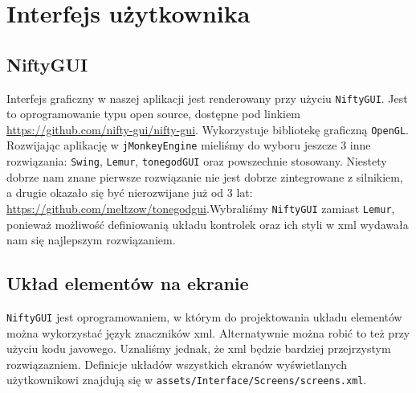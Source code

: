 \documentclass[]{report}
\newcommand{\code}[1]{\colorbox{codegray}{\texttt{#1}}}
\newcommand{\link}[1]{{\color{blue}\href{#1}{#1}}}
\begin{document}
\chapter*{Interfejs użytkownika}
\section{NiftyGUI}
Interfejs graficzny w naszej aplikacji jest renderowany przy użyciu \code{NiftyGUI}. Jest to oprogramowanie typu open source, dostępne pod linkiem \link{https://github.com/nifty-gui/nifty-gui}. Wykorzystuje bibliotekę graficzną \code{OpenGL}. Rozwijając aplikację w \code{jMonkeyEngine} mieliśmy do wyboru jeszcze 3 inne rozwiązania: \code{Swing}, \code{Lemur}, \code{tonegodGUI} oraz powszechnie stosowany. Niestety dobrze nam znane pierwsze rozwiązanie nie jest dobrze zintegrowane z silnikiem, a drugie okazało się być nierozwijane już od 3 lat: \link{https://github.com/meltzow/tonegodgui}.Wybraliśmy \code{NiftyGUI} zamiast \code{Lemur}, ponieważ możliwość definiowanią układu kontrolek oraz ich styli w xml wydawała nam się najlepszym rozwiązaniem.


\section{Układ elementów na ekranie}
\code{NiftyGUI} jest oprogramowaniem, w którym do projektowania układu elementów można wykorzystać język znaczników xml. Alternatywnie można robić to też przy użyciu kodu javowego. Uznaliśmy jednak, że xml będzie bardziej przejrzystym rozwiązazniem. Definicje układów wszystkich ekranów wyświetlanych użytkownikowi znajdują się w \code{assets/Interface/Screens/screens.xml}.
\end{document}
